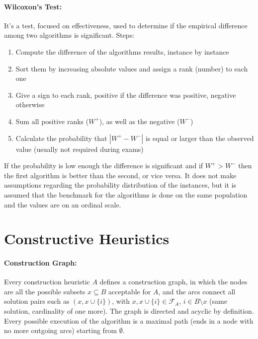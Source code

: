 \documentclass{article}
\begin{document}
	\paragraph{Wilcoxon's Test:} It's a test, focused on effectiveness, used to determine if the empirical difference among two algorithms is significant. Steps:
	\begin{enumerate}
		\item Compute the difference of the algorithms results, instance by instance
		\item Sort them by increasing absolute values and assign a rank (number) to each one
		\item Give a sign to each rank, positive if the difference was positive, negative otherwise
		\item Sum all positive ranks ($W^+$), as well as the negative ($W^-$)
		\item Calculate the probability that $|W^+ - W^-|$ is equal or larger than the observed value (usually not required during exams)
	\end{enumerate}
	If the probability is low enough the difference is significant and if $W^+ > W^-$ then the first algorithm is better than the second, or vice versa. It does not make assumptions regarding the probability distribution of the instances, but it is assumed that the benchmark for the algorithms is done on the same population and the values are on an ordinal scale.\\
	
	\section*{Constructive Heuristics}
	
	\paragraph{Construction Graph:} Every construction heuristic $A$ defines a construction graph, in which the nodes are all the possible subsets $x \subseteq B$ acceptable for $A$, and the arcs connect all solution pairs such as $(x, x \cup \{i\})$, with $x, x \cup \{i\} \in \mathcal{F}_A$, $i \in B \setminus x$ (same solution, cardinality of one more). The graph is directed and acyclic by definition. Every possible execution of the algorithm is a maximal path (ends in a node with no more outgoing arcs) starting from $\emptyset$.\\
	
\end{document}
